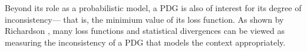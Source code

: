 \documentclass{article}
\newcommand\vjoe[1]{{\color{joecolor}\textbf{$\boldsymbol\{$Joe: }#1 \textbf{$\boldsymbol\}$}}}
\begin{document}
%
Beyond its role as a probabilistic model,
a PDG is also of interest for its degree of inconsistency---%
that is, the minimium value of its loss function. 
As shown by Richardson ,
many loss functions and statistical divergences
can be viewed as measuring 
the inconsistency
of a PDG that models the context appropriately.
\end{document}
